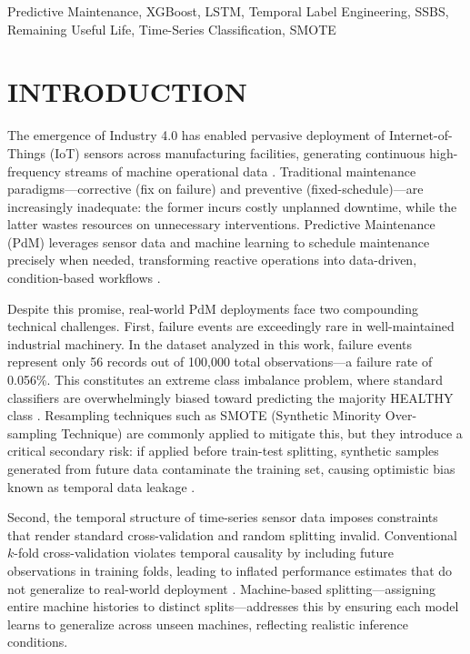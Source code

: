 \documentclass[conference]{IEEEtran}
\begin{document}
\begin{IEEEkeywords}
Predictive Maintenance, XGBoost, LSTM, Temporal Label Engineering, SSBS, Remaining Useful Life, Time-Series Classification, SMOTE
\end{IEEEkeywords}

\section{INTRODUCTION}

The emergence of Industry 4.0 has enabled pervasive deployment of Internet-of-Things (IoT) sensors across manufacturing facilities, generating continuous high-frequency streams of machine operational data \cite{lee2014industryiot}. Traditional maintenance paradigms—corrective (fix on failure) and preventive (fixed-schedule)—are increasingly inadequate: the former incurs costly unplanned downtime, while the latter wastes resources on unnecessary interventions. Predictive Maintenance (PdM) leverages sensor data and machine learning to schedule maintenance precisely when needed, transforming reactive operations into data-driven, condition-based workflows \cite{zhang2019pdmsurvey}.

Despite this promise, real-world PdM deployments face two compounding technical challenges. First, failure events are exceedingly rare in well-maintained industrial machinery. In the dataset analyzed in this work, failure events represent only 56 records out of 100,000 total observations---a failure rate of 0.056\%. This constitutes an extreme class imbalance problem, where standard classifiers are overwhelmingly biased toward predicting the majority HEALTHY class \cite{chawla2002smote}. Resampling techniques such as SMOTE (Synthetic Minority Over-sampling Technique) \cite{chawla2002smote} are commonly applied to mitigate this, but they introduce a critical secondary risk: if applied before train-test splitting, synthetic samples generated from future data contaminate the training set, causing optimistic bias known as temporal data leakage \cite{kaufman2012leakage}.

Second, the temporal structure of time-series sensor data imposes constraints that render standard cross-validation and random splitting invalid. Conventional $k$-fold cross-validation violates temporal causality by including future observations in training folds, leading to inflated performance estimates that do not generalize to real-world deployment \cite{bergmeir2018tscv}. Machine-based splitting—assigning entire machine histories to distinct splits—addresses this by ensuring each model learns to generalize across unseen machines, reflecting realistic inference conditions.
\end{document}
